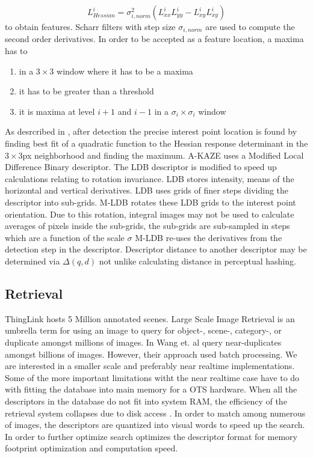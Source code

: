 \documentclass[english,12pt,a4paper,pdftex,elec,utf8, table]{aaltothesis}
\begin{document}
\begin{equation}
  \label{akazehessian}
L^i_{Hessian} = \sigma^2_{i,norm}(L^i_{xx}L^i_{yy}-L^i_{xy}L^i_{xy})
\end{equation}
to obtain features. Scharr filters with step size $\sigma_{i,norm}$ are used to compute the second order derivatives. In order to be accepted as a feature location, a maxima has to
\begin{enumerate}
\item in a $3 \times 3$ window where it has to be a maxima
\item it has to be greater than a threshold
\item it is maxima at level $i+1$ and $i-1$ in a $\sigma_i\times\sigma_i$ window
\end{enumerate}

As desrcribed in \cite{Alcantarilla2012}, after detection the precise interest point location is found by finding best fit of a quadratic function to the Hessian response determinant in the $3 \times 3$px neighborhood and finding the maximum. A-KAZE uses a Modified Local Difference Binary descriptor. The LDB descriptor is modified to speed up calculations relating to rotation invariance. LDB stores intensity, means of the horizontal and vertical derivatives. LDB uses grids of finer steps dividing the descriptor into sub-grids. M-LDB rotates these LDB grids to the interest point orientation. Due to this rotation, integral images may not be used to calculate averages of pixels inside the sub-grids, the sub-grids are sub-sampled in steps which are a function of the scale $\sigma$ M-LDB re-uses the derivatives from the detection step in the descriptor. Descriptor distance to another descriptor may be determined via $\Delta(q,d)$ not unlike calculating distance in perceptual hashing.

\clearpage

\subsection{Retrieval}
ThingLink hosts 5 Million annotated scenes. Large Scale Image Retrieval is an umbrella term for using an image to query for object-, scene-, category-, or duplicate amongst millions of images. In \cite{Wang2013} Wang et. al query near-duplicates amongst billions of images. However, their approach used batch processing. We are interested in a smaller scale and preferably near realtime implementations. Some of the more important limitations witht the near realtime case have to do with fitting the database into main memory for a OTS hardware. When all the descriptors in the database do not fit into system RAM, the efficiency of the retrieval system collapses due to disk access \cite{Philbin2007}. In order to match among numerous of images, the descriptors are quantized into visual words to speed up the search. In order to further optimize search \cite{Jegou2010} optimizes the descriptor format for memory footprint optimization and computation speed.
\end{document}
